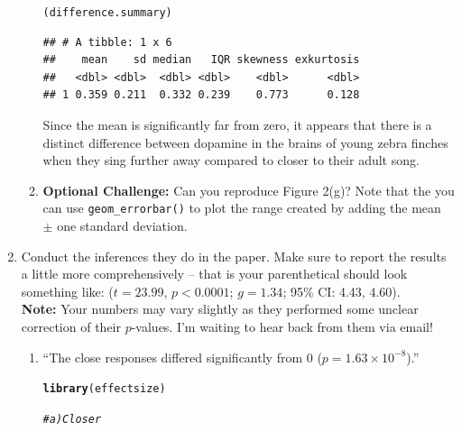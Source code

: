 \documentclass{article}\usepackage[]{graphicx}\usepackage[]{xcolor}
\makeatletter
\newcommand{\hlcom}[1]{\textcolor[rgb]{0.678,0.584,0.686}{\textit{#1}}}%
\newcommand{\hldef}[1]{\textcolor[rgb]{0.345,0.345,0.345}{#1}}%
\newcommand{\hlkwd}[1]{\textcolor[rgb]{0.737,0.353,0.396}{\textbf{#1}}}%
\newenvironment{kframe}{%
 \def\at@end@of@kframe{}%
 \ifinner\ifhmode%
  \def\at@end@of@kframe{\end{minipage}}%
  \begin{minipage}{\columnwidth}%
 \fi\fi%
 \def\FrameCommand##1{\hskip\@totalleftmargin \hskip-\fboxsep
 \colorbox{shadecolor}{##1}\hskip-\fboxsep
     \hskip-\linewidth \hskip-\@totalleftmargin \hskip\columnwidth}%
 \MakeFramed {\advance\hsize-\width
   \@totalleftmargin\z@ \linewidth\hsize
   \@setminipage}}%
 {\par\unskip\endMakeFramed%
 \at@end@of@kframe}
\newenvironment{knitrout}{}{} %
\makeatother
\begin{document}
\begin{enumerate}
\begin{enumerate}
\begin{knitrout}
\begin{kframe}
\begin{alltt}
\hldef{(difference.summary)}
\end{alltt}
\begin{verbatim}
## # A tibble: 1 x 6
##    mean    sd median   IQR skewness exkurtosis
##   <dbl> <dbl>  <dbl> <dbl>    <dbl>      <dbl>
## 1 0.359 0.211  0.332 0.239    0.773      0.128
\end{verbatim}
\end{kframe}
\end{knitrout}
Since the mean is significantly far from zero, it appears that there is a distinct difference between dopamine in the brains of
young zebra finches when they sing further away compared to 
closer to their adult song.

  \item \textbf{Optional Challenge:} Can you reproduce Figure 2(g)?
  Note that the you can use \texttt{geom\_errorbar()} to plot
  the range created by adding the mean $\pm$ one standard deviation.
\end{enumerate}
\item Conduct the inferences they do in the paper. Make sure to report the results
a little more comprehensively -- that is your parenthetical should look something
like: ($t=23.99$, $p<0.0001$; $g=1.34$; 95\% CI: 4.43, 4.60).\\
\textbf{Note:} Your numbers may vary slightly as they performed some unclear
correction of their $p$-values. I'm waiting to hear back from them via email!
\begin{enumerate}
  \item ``The close responses differed significantly from 0 ($p=1.63 \times 10^{-8}$).''
  
\begin{knitrout}\scriptsize
{}\color{fgcolor}\begin{kframe}
\begin{alltt}
\hlkwd{library}\hldef{(effectsize)}

\hlcom{# a) Closer}


\end{alltt}
\end{kframe}
\end{knitrout}
\end{enumerate}
\end{enumerate}
\end{document}
